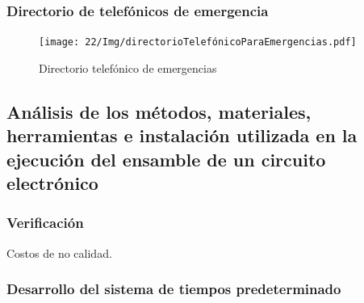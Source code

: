     
    \subsubsection{Directorio de telefónicos de emergencia}
    
    
    
    \begin{figure}[H] 
        \centering
        \texttt{[image: 22/Img/directorioTelefónicoParaEmergencias.pdf]}
        \caption{Directorio telefónico de emergencias}
        \label{fig:Directorio}
    \end{figure}
    
    
    
    \subsection{Análisis de los métodos, materiales, herramientas e instalación utilizada en la ejecución del ensamble de un circuito electrónico}
    
    \subsubsection{Verificación}
    
    Costos de no calidad.
    \subsubsection{Desarrollo del sistema de tiempos predeterminado}
    

